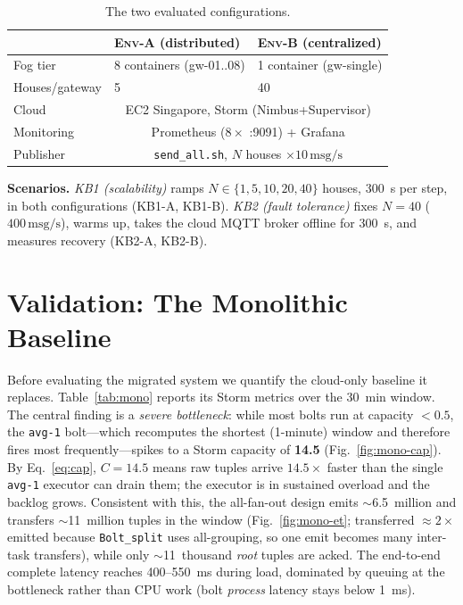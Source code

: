 \documentclass[conference]{IEEEtran}
\newcommand{\msgps}{\,\text{msg/s}}
\newcommand{\code}[1]{\texttt{#1}}
\begin{document}
\begin{table}[t]
\centering
\caption{The two evaluated configurations.}
\label{tab:env}
\footnotesize
\begin{tabular}{lll}
\toprule
 & \textsc{Env-A} (distributed) & \textsc{Env-B} (centralized) \\
\midrule
Fog tier      & 8 containers (gw-01..08) & 1 container (gw-single) \\
Houses/gateway& 5                        & 40 \\
Cloud         & \multicolumn{2}{c}{EC2 Singapore, Storm (Nimbus+Supervisor)} \\
Monitoring    & \multicolumn{2}{c}{Prometheus ($8\times$ :9091) + Grafana} \\
Publisher     & \multicolumn{2}{c}{\code{send\_all.sh}, $N$ houses $\times 10\msgps$} \\
\bottomrule
\end{tabular}
\end{table}

\textbf{Scenarios.} \emph{KB1 (scalability)} ramps $N\in\{1,5,10,20,40\}$ houses,
\SI{300}{\second} per step, in both configurations (KB1-A, KB1-B). \emph{KB2
(fault tolerance)} fixes $N=40$ ($400\msgps$), warms up, takes the cloud MQTT
broker offline for \SI{300}{\second}, and measures recovery (KB2-A, KB2-B).

\section{Validation: The Monolithic Baseline}\label{sec:mono}
Before evaluating the migrated system we quantify the cloud-only baseline it
replaces. Table~\ref{tab:mono} reports its Storm metrics over the
\SI{30}{\minute} window. The central finding is a \emph{severe bottleneck}:
while most bolts run at capacity $<0.5$, the \code{avg-1} bolt---which recomputes
the shortest (1-minute) window and therefore fires most frequently---spikes to a
Storm capacity of \textbf{14.5} (Fig.~\ref{fig:mono-cap}). By
Eq.~\eqref{eq:cap}, $C=14.5$ means raw tuples arrive $14.5\times$ faster than the
single \code{avg-1} executor can drain them; the executor is in sustained overload
and the backlog grows. Consistent with this, the all-fan-out design emits
$\sim$\SI{6.5}{}~million and transfers $\sim$\SI{11}{}~million tuples in the window
(Fig.~\ref{fig:mono-et}; transferred $\approx 2\times$ emitted because
\code{Bolt\_split} uses all-grouping, so one emit becomes many inter-task
transfers), while only $\sim$\SI{11}{}~thousand \emph{root} tuples are acked. The
end-to-end complete latency reaches \SI{400}{}--\SI{550}{\milli\second} during
load, dominated by queuing at the bottleneck rather than CPU work (bolt
\emph{process} latency stays below \SI{1}{\milli\second}).
\end{document}
